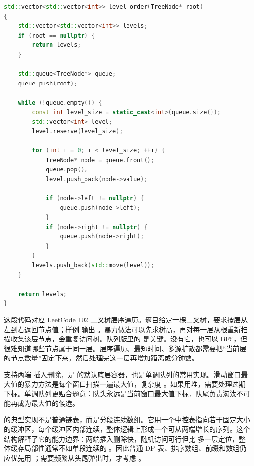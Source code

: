 \begin{lstlisting}[language=C++,caption={LeetCode 102 二叉树层序遍历：队列保存当前边界}]
std::vector<std::vector<int>> level_order(TreeNode* root)
{
    std::vector<std::vector<int>> levels;
    if (root == nullptr) {
        return levels;
    }

    std::queue<TreeNode*> queue;
    queue.push(root);

    while (!queue.empty()) {
        const int level_size = static_cast<int>(queue.size());
        std::vector<int> level;
        level.reserve(level_size);

        for (int i = 0; i < level_size; ++i) {
            TreeNode* node = queue.front();
            queue.pop();
            level.push_back(node->value);

            if (node->left != nullptr) {
                queue.push(node->left);
            }
            if (node->right != nullptr) {
                queue.push(node->right);
            }
        }
        levels.push_back(std::move(level));
    }

    return levels;
}
\end{lstlisting}

这段代码对应 LeetCode 102 二叉树层序遍历。题目给定一棵二叉树，要求按层从左到右返回节点值；样例  输出 \code{[[3],[9,20],[15,7]]}。暴力做法可以先求树高，再对每一层从根重新扫描收集该层节点，会重复访问树。队列版里的  是关键。没有它，也可以 BFS，但很难知道哪些节点属于同一层。层序遍历、最短时间、多源扩散都需要把“当前层的节点数量”固定下来，然后处理完这一层再增加距离或分钟数。

 支持两端  插入删除，是  的默认底层容器，也是单调队列的常用实现。滑动窗口最大值的暴力方法是每个窗口扫描一遍最大值，复杂度 。如果用堆，需要处理过期下标。单调队列更贴合题意：队头永远是当前窗口最大值下标，队尾负责淘汰不可能再成为最大值的候选。

 的典型实现不是普通链表，而是分段连续数组。它用一个中控表指向若干固定大小的缓冲区，每个缓冲区内部连续，整体逻辑上形成一个可从两端增长的序列。这个结构解释了它的能力边界：两端插入删除快，随机访问可行但比  多一层定位，整体缓存局部性通常不如单段连续的 。因此普通 DP 表、排序数组、前缀和数组仍应优先用 ；需要频繁从头尾弹出时，才考虑 。

